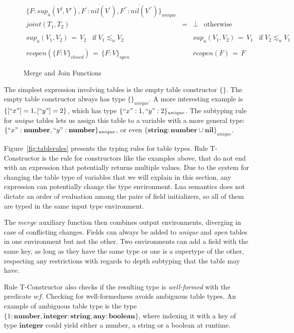\documentclass[10pt]{sigplanconf}
\newcommand{\Any}{\mathbf{any}}
\newcommand{\Nil}{\mathbf{nil}}
\newcommand{\Boolean}{\mathbf{boolean}}
\newcommand{\Integer}{\mathbf{integer}}
\newcommand{\Number}{\mathbf{number}}
\newcommand{\String}{\mathbf{string}}
\begin{document}
\begin{figure*}
{\[\begin{array}{rcl}
	\{\overline{F:sup_u(V^l,V^r)},\overline{F^\prime:nil(V^\prime)},\overline{F^{\prime\prime}:nil(V^{\prime\prime})}\}_{unique}\\
	joint(T_1, T_2) & = & \bot \;\;\; \mathrm{otherwise}\\\\
	sup_u(V_1, V_2) \,=\, V_2 \;\;\; \mathrm{if}\; V_1 \lesssim_u V_2 & &
	   sup_u(V_1, V_2) \,=\, V_1 \;\;\; \mathrm{if}\; V_2 \lesssim_u V_1 \\
	\\
	reopen(\{\overline{F:V}\}_{closed}) \,=\, \{\overline{F:V}\}_{open} & &
	  reopen(F) \,=\, F\end{array}
\]}
\caption{Merge and Join Functions}
\label{fig:mergejoin}
\end{figure*}

The simplest expression involving tables is the empty
table constructor $\{\}$. The empty table constructor always
has type $\{\}_{unique}$. A more interesting example is $\{ [``x"] = 1, [``y"] = 2 \}$, which has type $\{ ``x":1 , ``y": 2 \}_{unique}$. The subtyping rule for {\em unique} tables lets
us assign this table to a variable with a more general
type: $\{ ``x":\Number , ``y": \Number \}_{unique}$, or
even $\{ \String:\Number \cup \Nil \}_{unique}$. 

Figure~\ref{fig:tablerules} presents the typing rules for table types.
Rule {\sc T-Constructor} is the rule for constructors
like the examples above, that
do not end with an expression that potentially returns
multiple values.
Due to the system for changing the table type of variables that
we will explain in this section, any expression can potentially
change the type environment. Lua semantics does not dictate
an order of evaluation among the pairs of field initializers,
so all of them are typed in the same input type environment.

The $merge$ auxiliary function then combines output
environments, diverging in case of conflicting changes.
Fields can always be added to {\em unique} and {\em open}
tables in one environment but not the other. Two environments
can add a field with the same key, as long as they have
the same type or one is a supertype of the other, respecting
any restrictions with regards to depth subtyping that the table may have.  

Rule {\sc T-Constructor} also checks if the resulting type is {\em well-formed} with the predicate $wf$. Checking for well-formedness avoids ambiguous table types. An example of ambiguous table type is the type
$\{1:\Number, \Integer:\String, \Any:\Boolean\}$,
where indexing it with a key of type $\Integer$ could
yield either a number, a string or a boolean at runtime.
\end{document}
